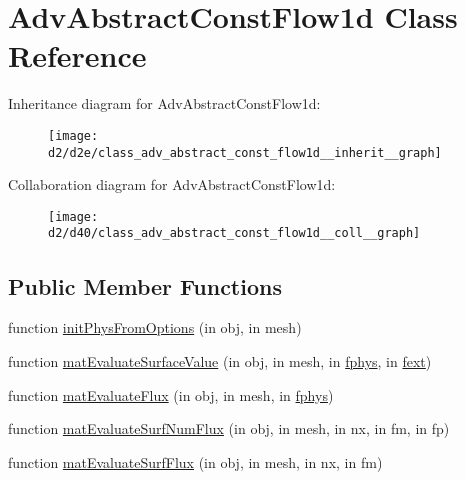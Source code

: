 \hypertarget{class_adv_abstract_const_flow1d}{}\section{Adv\+Abstract\+Const\+Flow1d Class Reference}
\label{class_adv_abstract_const_flow1d}


Inheritance diagram for Adv\+Abstract\+Const\+Flow1d\+:
\nopagebreak
\begin{figure}[H]
\begin{center}
\leavevmode
\texttt{[image: d2/d2e/class\_adv\_abstract\_const\_flow1d\_\_inherit\_\_graph]}
\end{center}
\end{figure}


Collaboration diagram for Adv\+Abstract\+Const\+Flow1d\+:
\nopagebreak
\begin{figure}[H]
\begin{center}
\leavevmode
\texttt{[image: d2/d40/class\_adv\_abstract\_const\_flow1d\_\_coll\_\_graph]}
\end{center}
\end{figure}
\subsection*{Public Member Functions}
\begin{DoxyCompactItemize}
\item 
function \hyperlink{class_adv_abstract_const_flow1d_a83527f3a518233bac0932ead50263fd1}{init\+Phys\+From\+Options} (in obj, in mesh)
\item 
function \hyperlink{class_adv_abstract_const_flow1d_a927ee6a8dd0604f2bba5eda13c157098}{mat\+Evaluate\+Surface\+Value} (in obj, in mesh, in \hyperlink{class_ndg_phys_a6b25724fc9474d32018439009072f0a9}{fphys}, in \hyperlink{class_ndg_phys_mat_a2b0e8a77bf5f6fe870b12e400d6d83f3}{fext})
\item 
function \hyperlink{class_adv_abstract_const_flow1d_a2d7ac58197ce4e90c712117ee5ef416b}{mat\+Evaluate\+Flux} (in obj, in mesh, in \hyperlink{class_ndg_phys_a6b25724fc9474d32018439009072f0a9}{fphys})
\item 
function \hyperlink{class_adv_abstract_const_flow1d_a04a976f93d778099de5a36cf91015870}{mat\+Evaluate\+Surf\+Num\+Flux} (in obj, in mesh, in nx, in fm, in fp)
\item 
function \hyperlink{class_adv_abstract_const_flow1d_aed1db94010a6e8800e6811382df63bee}{mat\+Evaluate\+Surf\+Flux} (in obj, in mesh, in nx, in fm)
\end{DoxyCompactItemize}
